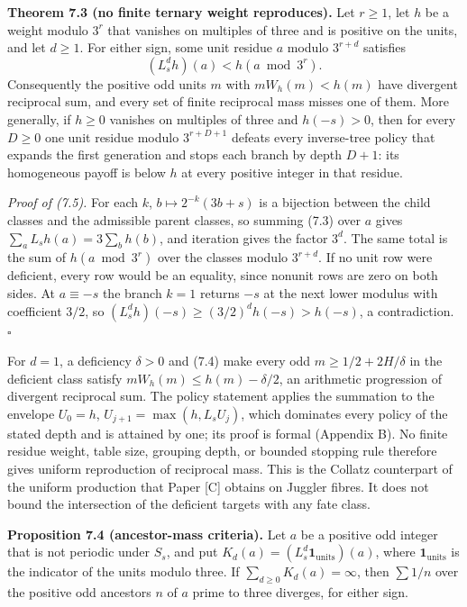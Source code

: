 \documentclass[11pt,a4paper]{article}
\begin{document}
\textbf{Theorem 7.3 (no finite ternary weight reproduces).} Let
\(r\ge1\), let \(h\) be a weight modulo \(3^r\) that vanishes on
multiples of three and is positive on the units, and let \(d\ge1\). For
either sign, some unit residue \(a\) modulo \(3^{r+d}\) satisfies \[
(L_s^dh)(a)<h(a\bmod3^r).
\tag{7.5}
\] Consequently the positive odd units \(m\) with \(mW_h(m)<h(m)\) have
divergent reciprocal sum, and every set of finite reciprocal mass misses
one of them. More generally, if \(h\ge0\) vanishes on multiples of three
and \(h(-s)>0\), then for every \(D\ge0\) one unit residue modulo
\(3^{r+D+1}\) defeats every inverse-tree policy that expands the first
generation and stops each branch by depth \(D+1\): its homogeneous
payoff is below \(h\) at every positive integer in that residue.

\emph{Proof of (7.5).} For each \(k\), \(b\mapsto2^{-k}(3b+s)\) is a
bijection between the child classes and the admissible parent classes,
so summing (7.3) over \(a\) gives \(\sum_aL_sh(a)=3\sum_bh(b)\), and
iteration gives the factor \(3^d\). The same total is the sum of
\(h(a\bmod3^r)\) over the classes modulo \(3^{r+d}\). If no unit row
were deficient, every row would be an equality, since nonunit rows are
zero on both sides. At \(a\equiv-s\) the branch \(k=1\) returns \(-s\)
at the next lower modulus with coefficient \(3/2\), so
\((L_s^dh)(-s)\ge(3/2)^dh(-s)>h(-s)\), a contradiction. \(\square\)

For \(d=1\), a deficiency \(\delta>0\) and (7.4) make every odd
\(m\ge1/2+2H/\delta\) in the deficient class satisfy
\(mW_h(m)\le h(m)-\delta/2\), an arithmetic progression of divergent
reciprocal sum. The policy statement applies the summation to the
envelope \(U_0=h\), \(U_{j+1}=\max(h,L_sU_j)\), which dominates every
policy of the stated depth and is attained by one; its proof is formal
(Appendix B). No finite residue weight, table size, grouping depth, or
bounded stopping rule therefore gives uniform reproduction of reciprocal
mass. This is the Collatz counterpart of the uniform production that
Paper {[}C{]} obtains on Juggler fibres. It does not bound the
intersection of the deficient targets with any fate class.

\textbf{Proposition 7.4 (ancestor-mass criteria).} Let \(a\) be a
positive odd integer that is not periodic under \(S_s\), and put
\(K_d(a)=(L_s^d\mathbf 1_{\mathrm{units}})(a)\), where
\(\mathbf 1_{\mathrm{units}}\) is the indicator of the units modulo
three. If \(\sum_{d\ge0}K_d(a)=\infty\), then \(\sum1/n\) over the
positive odd ancestors \(n\) of \(a\) prime to three diverges, for
either sign.
\end{document}
